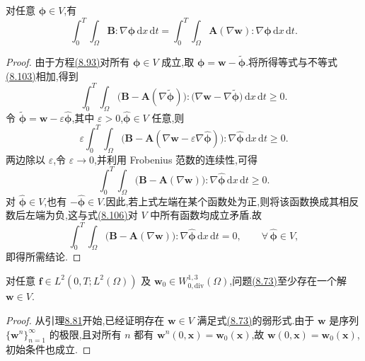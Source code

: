 \begin{lemma}[识别 $\bm{B}$ 与非线性黏性算子]
\label{lem:smagorinsky-identifying-limit-operator}
对任意 $\symbf{\phi}\in V$,有
\[
 \int_0^T\int_\Omega \bm{B}:\nabla\symbf{\phi}\,
                     \mathrm{d}x\,\mathrm{d}t
 =\int_0^T\int_\Omega
       \bm{A}(\nabla\bm{w}):\nabla\symbf{\phi}
                     \,\mathrm{d}x\,\mathrm{d}t.
\]
\begin{proof}
由于方程\hyperref[eq:smagorinsky-limiting-equation]{(8.93)}对所有 $\symbf{\phi}\in V$ 成立,取
$\symbf{\phi}=\bm{w}-\widetilde{\symbf{\phi}}$.将所得等式与不等式\hyperref[eq:smagorinsky-weak-equation-difference]{(8.103)}相加,得到
\[
 \int_0^T\int_\Omega
   \bigl(\bm{B}-\bm{A}(\nabla\widetilde{\symbf{\phi}})\bigr)
       :\bigl(\nabla\bm{w}-\nabla\widetilde{\symbf{\phi}}\bigr)
                       \,\mathrm{d}x\,\mathrm{d}t\ge0.
\]
令 $\widetilde{\symbf{\phi}}=\bm{w}-\varepsilon\widehat{\symbf{\phi}}$,其中 $\varepsilon>0$,$\widehat{\symbf{\phi}}\in V$ 任意,则
\[
 \varepsilon\int_0^T\int_\Omega
   \bigl(\bm{B}-\bm{A}(\nabla\bm{w}
                         -\varepsilon\nabla\widehat{\symbf{\phi}})\bigr)
       :\nabla\widehat{\symbf{\phi}}\,
                         \mathrm{d}x\,\mathrm{d}t\ge0.
\]
两边除以 $\varepsilon$,令 $\varepsilon\to0$,并利用 Frobenius 范数的连续性,可得
\begin{equation}\label{eq:smagorinsky-identifying-operator-inequality}
 \int_0^T\int_\Omega
   \bigl(\bm{B}-\bm{A}(\nabla\bm{w})\bigr)
       :\nabla\widehat{\symbf{\phi}}\,
                       \mathrm{d}x\,\mathrm{d}t\ge0.
\end{equation}
对 $\widehat{\symbf{\phi}}\in V$,也有 $-\widehat{\symbf{\phi}}\in V$.因此,若上式左端在某个函数处为正,则将该函数换成其相反数后左端为负,这与式\hyperref[eq:smagorinsky-identifying-operator-inequality]{(8.106)}对 $V$ 中所有函数均成立矛盾.故
\[
 \int_0^T\int_\Omega
   \bigl(\bm{B}-\bm{A}(\nabla\bm{w})\bigr)
       :\nabla\widehat{\symbf{\phi}}\,
                       \mathrm{d}x\,\mathrm{d}t=0,
 \qquad \forall\,\widehat{\symbf{\phi}}\in V,
\]
即得所需结论.
\end{proof}
\end{lemma}

\begin{theorem}[弱解的存在性]
\label{thm:smagorinsky-weak-solution-existence}
对任意 $\bm{f}\in L^2(0,T;L^2(\Omega))$ 及
$\bm{w}_0\in W_{0,\mathrm{div}}^{1,3}(\Omega)$,问题\hyperref[eq:smagorinsky-weak-form]{(8.73)}至少存在一个解 $\bm{w}\in V$.
\begin{proof}
从引理\hyperref[lem:smagorinsky-convergent-subsequence]{8.81}开始,已经证明存在 $\bm{w}\in V$ 满足式\hyperref[eq:smagorinsky-weak-form]{(8.73)}的弱形式.由于 $\bm{w}$ 是序列 $\{\bm{w}^n\}_{n=1}^{\infty}$ 的极限,且对所有 $n$ 都有 $\bm{w}^n(0,\bm{x})=\bm{w}_0(\bm{x})$,故 $\bm{w}(0,\bm{x})=\bm{w}_0(\bm{x})$,初始条件也成立.
\end{proof}
\end{theorem}

